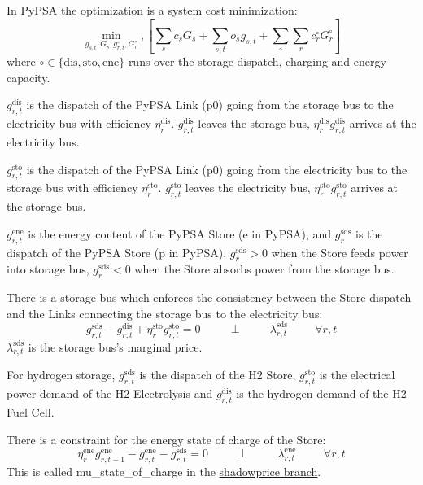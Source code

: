 \documentclass[final,3p,times]{elsarticle}
\begin{document}
In PyPSA the optimization is a system cost minimization:
\begin{equation}
    \min_{g_{s,t}, G_s,g^{\circ}_{r,t},G^{\circ}_{r}},\left[ \sum_s c_s G_s + \sum_{s,t} o_{s} g_{s,t} +\sum_{\circ}\sum_r c^{\circ}_r G^{\circ}_r\right]  \label{eq:objpypsa}
\end{equation}
where $\circ\in \{\textrm{dis},\textrm{sto},\textrm{ene}\}$ runs over
the storage dispatch, charging and energy capacity.

$g^{\textrm{dis}}_{r,t}$ is the dispatch of the PyPSA Link (p0) going from the storage bus to the electricity bus with efficiency $\eta^{\textrm{dis}}_r$. $g^{\textrm{dis}}_{r,t}$ leaves the storage bus, $\eta^{\textrm{dis}}_rg^{\textrm{dis}}_{r,t}$ arrives at the electricity bus.

$g^{\textrm{sto}}_{r,t}$ is the dispatch of the PyPSA Link (p0) going from the electricity bus to the storage bus with efficiency $\eta^{\textrm{sto}}_r$.  $g^{\textrm{sto}}_{r,t}$ leaves the electricity bus, $\eta^{\textrm{sto}}_rg^{\textrm{sto}}_{r,t}$ arrives at the storage bus.

$g^{\textrm{ene}}_{r,t}$ is the energy content of the PyPSA Store (e in PyPSA), and $g^{\textrm{sds}}_r$ is the dispatch of the PyPSA Store (p in PyPSA). $g^{\textrm{sds}}_r > 0$ when the Store feeds power into storage bus, $g^{\textrm{sds}}_r < 0$ when the Store absorbs power from the storage bus.

There is a storage bus which enforces the consistency between the
Store dispatch and the Links connecting the storage bus to the electricity bus:
\begin{equation}
  g^{\textrm{sds}}_{r,t} - g^{\textrm{dis}}_{r,t} + \eta^{\textrm{sto}}_r g^{\textrm{sto}}_{r,t} = 0  \hspace{1cm}\perp \hspace{1cm} \lambda^{\textrm{sds}}_{r,t} \hspace{1cm} \forall r,t \label{eq:biddingconstraint}
\end{equation}
$\lambda^{\textrm{sds}}_{r,t}$ is the storage bus's marginal price.

For hydrogen storage, $g^{\textrm{sds}}_{r,t}$ is the dispatch of the H2 Store, $g^{\textrm{sto}}_{r,t}$ is the electrical power demand of the H2 Electrolysis and $g^{\textrm{dis}}_{r,t}$ is the hydrogen demand of the H2 Fuel Cell.

There is a constraint for the energy state of charge of the Store:
\begin{equation}
  \eta^{\textrm{ene}}_r g^{\textrm{ene}}_{r,t-1} - g^{\textrm{ene}}_{r,t} - g^{\textrm{sds}}_{r,t} = 0  \hspace{1cm}\perp \hspace{1cm} \lambda^{\textrm{ene}}_{r,t} \hspace{1cm} \forall r,t  \label{eq:soc3}
\end{equation}
This is called mu\_state\_of\_charge in the \href{https://github.com/PyPSA/PyPSA/blob/shadowprices/pypsa/linopf.py}{shadowprice branch}.
\end{document}
